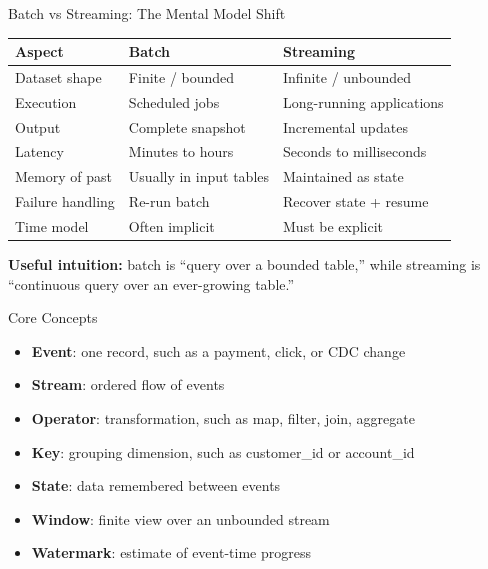 \documentclass[aspectratio=169]{beamer}
\begin{document}
\begin{frame}{Batch vs Streaming: The Mental Model Shift}
\begin{table}
\centering
\small
\begin{tabular}{>{\raggedright\arraybackslash}p{3.2cm} >{\raggedright\arraybackslash}p{4.0cm} >{\raggedright\arraybackslash}p{4.0cm}}
\toprule
Aspect & Batch & Streaming \\
\midrule
Dataset shape & Finite / bounded & Infinite / unbounded \\
Execution & Scheduled jobs & Long-running applications \\
Output & Complete snapshot & Incremental updates \\
Latency & Minutes to hours & Seconds to milliseconds \\
Memory of past & Usually in input tables & Maintained as state \\
Failure handling & Re-run batch & Recover state + resume \\
Time model & Often implicit & Must be explicit \\
\bottomrule
\end{tabular}
\end{table}

\vspace{0.3cm}
\textbf{Useful intuition:} batch is ``query over a bounded table,'' while streaming is ``continuous query over an ever-growing table.''
\end{frame}

\begin{frame}{Core Concepts}
\begin{itemize}
    \item \textbf{Event}: one record, such as a payment, click, or CDC change
    \item \textbf{Stream}: ordered flow of events
    \item \textbf{Operator}: transformation, such as map, filter, join, aggregate
    \item \textbf{Key}: grouping dimension, such as customer\_id or account\_id
    \item \textbf{State}: data remembered between events
    \item \textbf{Window}: finite view over an unbounded stream
    \item \textbf{Watermark}: estimate of event-time progress
\end{itemize}
\end{frame}
\end{document}
